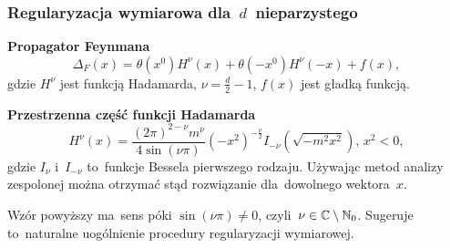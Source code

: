 \documentclass[10pt,t]{beamer}
\begin{document}
\begin{frame}
  \frametitle{Regularyzacja wymiarowa dla~$d$~nieparzystego}


  \textbf{Propagator Feynmana}
  \begin{equation}
    \label{eq:Epstein-Glaser-14}
    \Delta_{ F }( x ) =
    \theta( x^{ 0 } ) H^{ \nu }( x ) + \theta( -x^{ 0 } ) H^{ \nu }( -x ) + f( x ),
  \end{equation}
  gdzie $H^{ \nu }$ jest funkcją Hadamarda,
  $\nu = \frac{ d }{ 2 } - 1$, $f( x )$ jest gładką funkcją.

  \vspace{\spaceThree}



  \textbf{Przestrzenna część funkcji Hadamarda}
  \begin{equation}
    \label{eq:Epstein-Glaser-15}
    H^{ \nu }( x ) =
    \frac{ ( 2 \pi )^{ 2 - \nu } m^{ \nu } }{ 4 \sin( \nu \pi ) }
    \left( -x^{ 2 } \right)^{ -\frac{ \nu }{ 2 } }
    I_{ -\nu }( \sqrt{ -m^{ 2 } x^{ 2 } } ), \, x^{ 2 } < 0,
  \end{equation}
  gdzie $I_{ \nu }$ i~$I_{ -\nu }$ to~funkcje Bessela pierwszego rodzaju.
  Używając metod analizy zespolonej można otrzymać stąd rozwiązanie
  dla~dowolnego wektora~$x$.

  \vspace{\spaceFour}



  Wzór powyższy ma~sens póki $\sin( \nu \pi ) \neq 0$,
  czyli~$\nu \in \mathbb{C} \setminus \mathbb{N}_{ 0 }$. Sugeruje
  to~naturalne uogólnienie procedury regularyzacji wymiarowej.

\end{frame}
\end{document}
